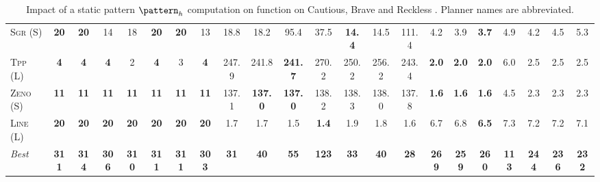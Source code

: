 \documentclass[11pt,landscape]{article}
\begin{document}
\begin{table}[tb]
{\begin{tabular}{|l||ccccccc||ccccccc||ccccccc||}
\textsc{Sgr} (S)&\textbf{20}&\textbf{20}&14&18&\textbf{20}&\textbf{20}&13&18.8&18.2&95.4&37.5&\textbf{14.4}&14.5&111.4&4.2&3.9&\textbf{3.7}&4.9&4.2&4.5&5.3\\
\textsc{Tpp} (L)&\textbf{4}&\textbf{4}&\textbf{4}&2&\textbf{4}&3&\textbf{4}&247.9&241.8&\textbf{241.7}&270.2&250.2&256.2&243.4&\textbf{2.0}&\textbf{2.0}&\textbf{2.0}&6.0&2.5&2.5&2.5\\
\textsc{Zeno} (S)&\textbf{11}&\textbf{11}&\textbf{11}&\textbf{11}&\textbf{11}&\textbf{11}&\textbf{11}&137.1&\textbf{137.0}&\textbf{137.0}&138.2&138.3&138.0&137.8&\textbf{1.6}&\textbf{1.6}&\textbf{1.6}&4.5&2.3&2.3&2.3\\
\textsc{Line} (L)&\textbf{20}&\textbf{20}&\textbf{20}&\textbf{20}&\textbf{20}&\textbf{20}&\textbf{20}&1.7&1.7&1.5&\textbf{1.4}&1.9&1.8&1.6&6.7&6.8&\textbf{6.5}&7.3&7.2&7.2&7.1
\\\hline
\textit{Best}&\textbf{311}&\textbf{314}&\textbf{306}&\textbf{310}&\textbf{311}&\textbf{311}&\textbf{303}&\textbf{31}&\textbf{40}&\textbf{55}&\textbf{123}&\textbf{33}&\textbf{40}&\textbf{28}&\textbf{269}&\textbf{259}&\textbf{260}&\textbf{113}&\textbf{244}&\textbf{236}&\textbf{232}\\\hline

        \end{tabular}}
        \caption{Impact of a static pattern $\pattern_h$ computation on function on Cautious, Brave and Reckless \pattyd. Planner names are abbreviated.}
        \label{tab:abl-patternh-static}
        \end{table}
        
\end{document}
